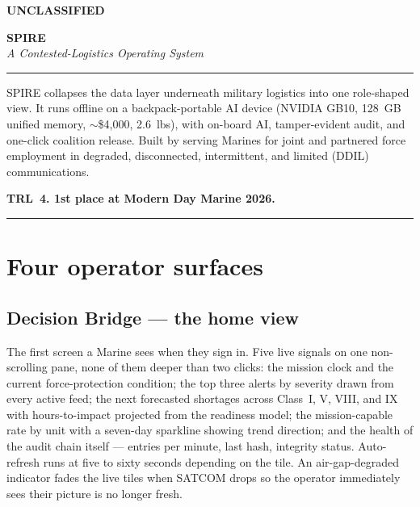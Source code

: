 \documentclass[10.5pt]{extarticle}
\newcommand{\classband}[0]{%
  \begin{center}\textbf{UNCLASSIFIED}\end{center}%
}
\begin{document}
\justifying

\classband

\vspace{6pt}
\begin{center}
  {\fontsize{24pt}{26pt}\selectfont\bfseries SPIRE}\\[2pt]
  {\fontsize{12pt}{14pt}\selectfont\itshape A Contested-Logistics Operating System}
\end{center}

\vspace{4pt}
\noindent\rule{\linewidth}{0.4pt}

\vspace{4pt}
\noindent SPIRE collapses the data layer underneath military logistics
into one role-shaped view. It runs offline on a backpack-portable AI device (NVIDIA GB10, 128~GB unified memory, $\sim$\$4{,}000, 2.6~lbs), with
on-board AI, tamper-evident audit, and one-click coalition release. Built
by serving Marines for joint and partnered force employment in degraded,
disconnected, intermittent, and limited (DDIL) communications.

\vspace{2pt}
\noindent\textbf{TRL~4. 1st place at Modern Day Marine 2026.}

\vspace{2pt}
\noindent\rule{\linewidth}{0.4pt}

\section*{Four operator surfaces}

\subsection*{Decision Bridge --- the home view}
The first screen a Marine sees when they sign in. Five live signals on
one non-scrolling pane, none of them deeper than two clicks: the mission
clock and the current force-protection condition; the top three alerts
by severity drawn from every active feed; the next forecasted shortages
across Class~I, V, VIII, and IX with hours-to-impact projected from the
readiness model; the mission-capable rate by unit with a seven-day
sparkline showing trend direction; and the health of the audit chain
itself --- entries per minute, last hash, integrity status. Auto-refresh
runs at five to sixty seconds depending on the tile. An air-gap-degraded
indicator fades the live tiles when SATCOM drops so the operator
immediately sees their picture is no longer fresh.
\end{document}
